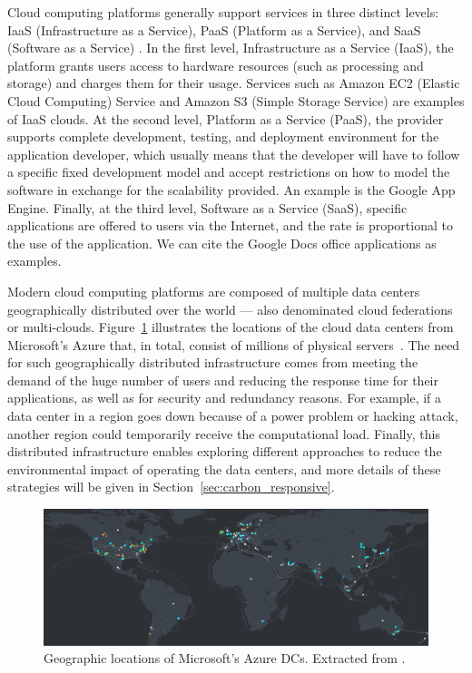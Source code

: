 Cloud computing platforms generally support services in three distinct levels: IaaS (Infrastructure as a Service), PaaS (Platform as a Service), and SaaS (Software as a Service) \citep{fos08}. In the first level, Infrastructure as a Service (IaaS), the platform grants users access to hardware resources (such as processing and storage) and charges them for their usage. Services such as Amazon EC2 (Elastic Cloud Computing) Service and Amazon S3 (Simple Storage Service) are examples of IaaS clouds.   At the second level, Platform as a Service (PaaS), the provider supports complete development, testing, and deployment environment for the application developer, which usually means that the developer will have to follow a specific fixed development model and accept restrictions on how to model the software in exchange for the scalability provided. An example is the Google App Engine. Finally, at the third level, Software as a Service (SaaS), specific applications are offered to users via the Internet, and the rate is proportional to the use of the application. We can cite the  Google Docs office applications as examples.

Modern cloud computing platforms are composed of multiple data centers geographically distributed over the world --- also denominated cloud federations or multi-clouds. Figure~\ref{fig:dc_locations} illustrates the locations of the cloud data centers from Microsoft's Azure that, in total, consist of millions of physical servers~\cite{roach2021_microsoftazure}. The need for such geographically distributed infrastructure comes from meeting the demand of the huge number of users and reducing the response time for their applications, as well as for security and redundancy reasons. For example, if a data center in a region goes down because of a power problem or hacking attack, another region could temporarily receive the computational load. Finally, this distributed infrastructure enables exploring different approaches to reduce the environmental impact of operating the data centers, and more details of these strategies will be given in Section~\ref{sec:carbon_responsive}.


\begin{figure}[h]
\centering
  \includegraphics[width=\linewidth]{images/azure_cloud_infra.png}
  \caption{Geographic locations of Microsoft's Azure DCs. Extracted from \cite{azure_dcs_location}.}
  \label{fig:dc_locations}
\end{figure}


